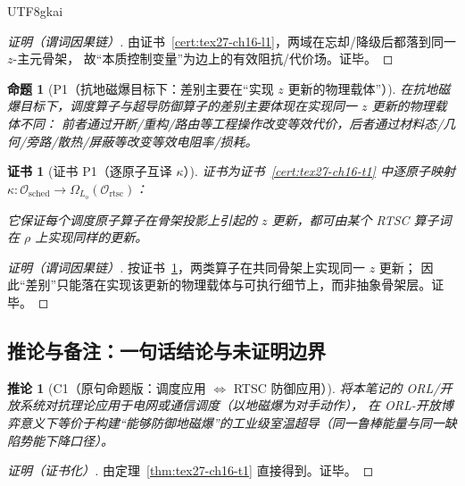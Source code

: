 \documentclass[12pt]{article}
\newtheorem{proposition}{命题}[section]
\newtheorem{corollary}{推论}[section]
\newtheorem{Certificate}{证书}[section]
\begin{document}
\begin{CJK*}{UTF8}{gkai}
\begin{proof}[证明（谓词因果链）]
由证书~\ref{cert:tex27-ch16-l1}，两域在忘却/降级后都落到同一 $z$-主元骨架，
故“本质控制变量”为边上的有效阻抗/代价场。证毕。
\end{proof}

\begin{proposition}[P1（抗地磁爆目标下：差别主要在“实现 $z$ 更新的物理载体”）]
\label{prop:tex27-ch16-p1}
在抗地磁爆目标下，调度算子与超导防御算子的差别主要体现在实现同一 $z$ 更新的物理载体不同：
前者通过开断/重构/路由等工程操作改变等效代价，后者通过材料态/几何/旁路/散热/屏蔽等改变等效电阻率/损耗。
\end{proposition}

\begin{Certificate}[证书 P1（逐原子互译 $\kappa$）]
\label{cert:tex27-ch16-p1}
证书为证书~\ref{cert:tex27-ch16-t1} 中逐原子映射 $\kappa:\mathcal{O}_{\mathrm{sched}}\to \Omega_{L_o}(\mathcal{O}_{\mathrm{rtsc}})$：

它保证每个调度原子算子在骨架投影上引起的 $z$ 更新，都可由某个 RTSC 算子词在 $\rho$ 上实现同样的更新。
\end{Certificate}

\begin{proof}[证明（谓词因果链）]
按证书~\ref{cert:tex27-ch16-p1}，两类算子在共同骨架上实现同一 $z$ 更新；
因此“差别”只能落在实现该更新的物理载体与可执行细节上，而非抽象骨架层。证毕。
\end{proof}

\subsection{推论与备注：一句话结论与未证明边界}
\label{subsec:tex27-ch16-cor-remarks}

\begin{corollary}[C1（原句命题版：调度应用 $\Longleftrightarrow$ RTSC 防御应用）]
\label{cor:tex27-ch16-c1}
将本笔记的 ORL/开放系统对抗理论应用于电网或通信调度（以地磁爆为对手动作），
在 ORL-开放博弈意义下等价于构建“能够防御地磁爆”的工业级室温超导（同一鲁棒能量与同一缺陷势能下降口径）。
\end{corollary}

\begin{proof}[证明（证书化）]
由定理~\ref{thm:tex27-ch16-t1} 直接得到。证毕。
\end{proof}


\end{CJK*}
\end{document}
